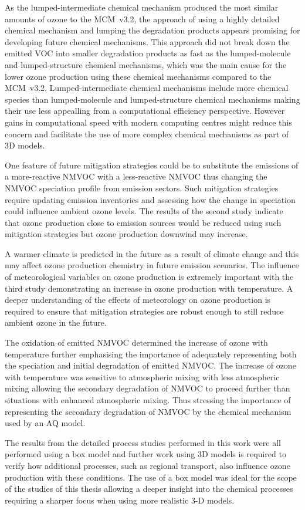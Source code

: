 As the lumped-intermediate chemical mechanism produced the most similar amounts of ozone to the MCM~v3.2, the approach of using a highly detailed chemical mechanism and lumping the degradation products appears promising for developing future chemical mechanisms.
This approach did not break down the emitted VOC into smaller degradation products as fast as the lumped-molecule and lumped-structure chemical mechanisms, which was the main cause for the lower ozone production using these chemical mechanisms compared to the MCM~v3.2.
Lumped-intermediate chemical mechanisms include more chemical species than lumped-molecule and lumped-structure chemical mechanisms making their use less appealling from a computational efficiency perspective.
However gains in computational speed with modern computing centres might reduce this concern and facilitate the use of more complex chemical mechanisms as part of 3D models.

One feature of future mitigation strategies could be to substitute the emissions of a more-reactive NMVOC with a less-reactive NMVOC thus changing the NMVOC speciation profile from emission sectors.
Such mitigation strategies require updating emission inventories and assessing how the change in speciation could influence ambient ozone levels.
The results of the second study indicate that ozone production close to emission sources would be reduced using such mitigation strategies but ozone production downwind may increase.

A warmer climate is predicted in the future as a result of climate change and this may affect ozone production chemistry in future emission scenarios.
The influence of meteorological variables on ozone production is extremely important with the third study demonstrating an increase in ozone production with temperature.
A deeper understanding of the effects of meteorology on ozone production is required to ensure that mitigation strategies are robust enough to still reduce ambient ozone in the future.

The oxidation of emitted NMVOC determined the increase of ozone with temperature further emphasising the importance of adequately representing both the speciation and initial degradation of emitted NMVOC.
The increase of ozone with temperature was sensitive to atmospheric mixing with less atmospheric mixing allowing the secondary degradation of NMVOC to proceed further than situations with enhanced atmospheric mixing.
Thus stressing the importance of representing the secondary degradation of NMVOC by the chemical mechanism used by an AQ model.

The results from the detailed process studies performed in this work were all performed using a box model and further work using 3D models is required to verify how additional processes, such as regional transport, also influence ozone production with these conditions.
The use of a box model was ideal for the scope of the studies of this thesis allowing a deeper insight into the chemical processes requiring a sharper focus when using more realistic 3-D models.

